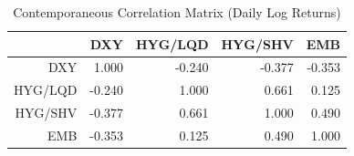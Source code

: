 \begin{table}[H]
\centering
\begin{tabular}{rrrrr}
  \toprule
 & DXY & HYG/LQD & HYG/SHV & EMB \\ 
  \midrule
DXY & 1.000 & -0.240 & -0.377 & -0.353 \\ 
  HYG/LQD & -0.240 & 1.000 & 0.661 & 0.125 \\ 
  HYG/SHV & -0.377 & 0.661 & 1.000 & 0.490 \\ 
  EMB & -0.353 & 0.125 & 0.490 & 1.000 \\ 
   \bottomrule
\end{tabular}
\caption{Contemporaneous Correlation Matrix (Daily Log Returns)} 
\label{tab:corr_dollar}
\end{table}
